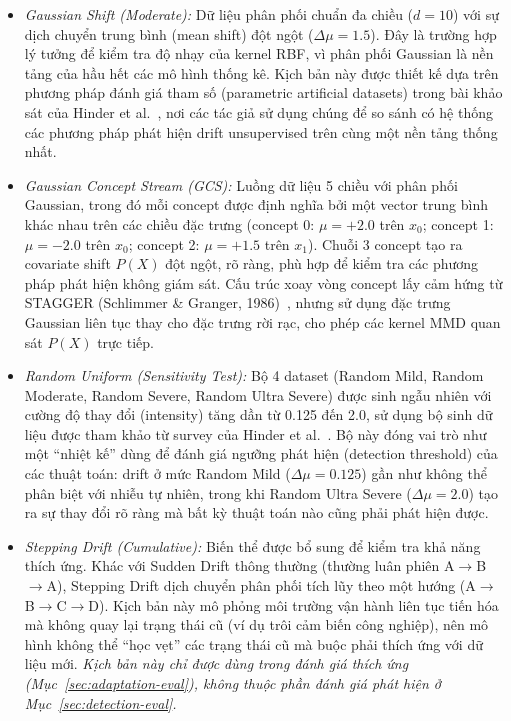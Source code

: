 \begin{itemize}
	\item \textit{Gaussian Shift (Moderate):} Dữ liệu phân phối chuẩn đa chiều ($d=10$) với sự dịch chuyển trung bình (mean shift) đột ngột ($\Delta\mu = 1.5$). Đây là trường hợp lý tưởng để kiểm tra độ nhạy của kernel RBF, vì phân phối Gaussian là nền tảng của hầu hết các mô hình thống kê. Kịch bản này được thiết kế dựa trên phương pháp đánh giá tham số (parametric artificial datasets) trong bài khảo sát của Hinder et al.~\cite{hinder2024survey_partA}, nơi các tác giả sử dụng chúng để so sánh có hệ thống các phương pháp phát hiện drift unsupervised trên cùng một nền tảng thống nhất.

	\item \textit{Gaussian Concept Stream (GCS):} Luồng dữ liệu 5 chiều với phân phối Gaussian, trong đó mỗi concept được định nghĩa bởi một vector trung bình khác nhau trên các chiều đặc trưng (concept 0: $\mu = +2.0$ trên $x_0$; concept 1: $\mu = -2.0$ trên $x_0$; concept 2: $\mu = +1.5$ trên $x_1$). Chuỗi 3 concept tạo ra covariate shift $P(X)$ đột ngột, rõ ràng, phù hợp để kiểm tra các phương pháp phát hiện không giám sát. Cấu trúc xoay vòng concept lấy cảm hứng từ STAGGER (Schlimmer \& Granger, 1986)~\cite{schlimmer1986incremental}, nhưng sử dụng đặc trưng Gaussian liên tục thay cho đặc trưng rời rạc, cho phép các kernel MMD quan sát $P(X)$ trực tiếp.

	\item \textit{Random Uniform (Sensitivity Test):} Bộ 4 dataset (Random Mild, Random Moderate, Random Severe, Random Ultra Severe) được sinh ngẫu nhiên với cường độ thay đổi (intensity) tăng dần từ 0.125 đến 2.0, sử dụng bộ sinh dữ liệu được tham khảo từ survey của Hinder et al.~\cite{hinder2024survey_partA}. Bộ này đóng vai trò như một ``nhiệt kế'' dùng để đánh giá ngưỡng phát hiện (detection threshold) của các thuật toán: drift ở mức Random Mild ($\Delta\mu = 0.125$) gần như không thể phân biệt với nhiễu tự nhiên, trong khi Random Ultra Severe ($\Delta\mu = 2.0$) tạo ra sự thay đổi rõ ràng mà bất kỳ thuật toán nào cũng phải phát hiện được.

	\item \textit{Stepping Drift (Cumulative):} Biến thể được bổ sung để kiểm tra khả năng thích ứng. Khác với Sudden Drift thông thường (thường luân phiên A$\to$B$\to$A), Stepping Drift dịch chuyển phân phối tích lũy theo một hướng (A$\to$B$\to$C$\to$D). Kịch bản này mô phỏng môi trường vận hành liên tục tiến hóa mà không quay lại trạng thái cũ (ví dụ trôi cảm biến công nghiệp), nên mô hình không thể ``học vẹt'' các trạng thái cũ mà buộc phải thích ứng với dữ liệu mới. \textit{Kịch bản này chỉ được dùng trong đánh giá thích ứng (Mục~\ref{sec:adaptation-eval}), không thuộc phần đánh giá phát hiện ở Mục~\ref{sec:detection-eval}.}
\end{itemize}

